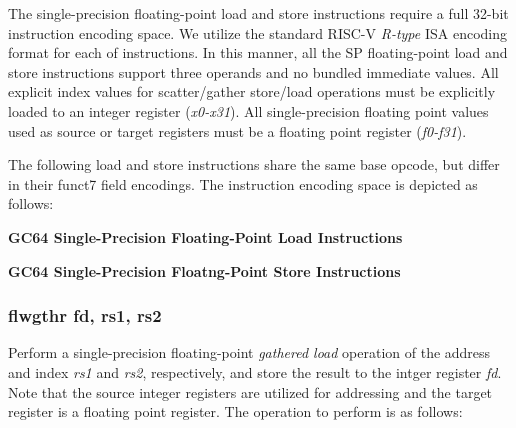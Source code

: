\documentclass{article}
\begin{document}
The single-precision floating-point load and store instructions
require a full 32-bit instruction encoding space.  We utilize the 
standard RISC-V \emph{R-type} ISA encoding format for each of instructions.  In
this manner, all the SP floating-point load and store instructions support
three operands and no bundled immediate values.  All explicit index
values for scatter/gather store/load operations must be explicitly
loaded to an integer register (\emph{x0-x31}).  All single-precision
floating point values used as source or target registers must be a floating
point register (\emph{f0-f31}).

The following load and store instructions share the same base
opcode, but differ in their funct7 field encodings.  The instruction
encoding space is depicted as follows:


\begin{center}
\textbf{GC64 Single-Precision Floating-Point Load Instructions}
\makebox[0.03in][s]{}\makebox[0.03in][s]{}\makebox[0.03in][s]{}\makebox[0.03in][s]{}\makebox[0.03in][s]{}
\end{center}

\begin{center}
\textbf{GC64 Single-Precision Floatng-Point Store Instructions}
\makebox[0.03in][s]{}\makebox[0.03in][s]{}\makebox[0.03in][s]{}\makebox[0.03in][s]{}\makebox[0.03in][s]{}
\end{center}

\subsubsection{flwgthr fd, rs1, rs2}

Perform a single-precision floating-point \emph{gathered load} operation of the
address and index \emph{rs1} and \emph{rs2}, respectively, and store the result
to the intger register \emph{fd}.  Note that the source integer registers are
utilized for addressing and the target register is a floating point register.
The operation to perform is as follows:
\end{document}

